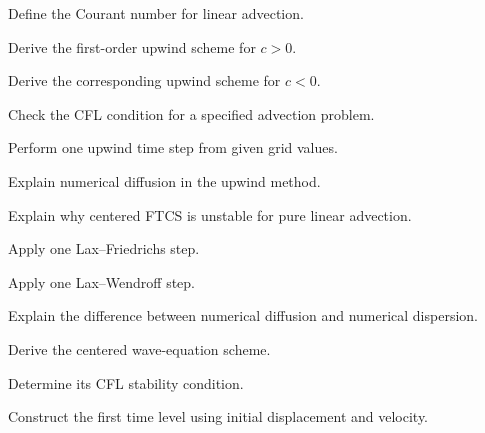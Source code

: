 \begin{exercise}[2]
Define the Courant number for linear advection.
\end{exercise}

\begin{exercise}[3]
Derive the first-order upwind scheme for \(c>0\).
\end{exercise}

\begin{exercise}[3]
Derive the corresponding upwind scheme for \(c<0\).
\end{exercise}

\begin{exercise}[3]
Check the CFL condition for a specified advection problem.
\end{exercise}

\begin{exercise}[3]
Perform one upwind time step from given grid values.
\end{exercise}

\begin{exercise}[3]
Explain numerical diffusion in the upwind method.
\end{exercise}

\begin{exercise}[3]
Explain why centered FTCS is unstable for pure linear advection.
\end{exercise}

\begin{exercise}[3]
Apply one Lax--Friedrichs step.
\end{exercise}

\begin{exercise}[3]
Apply one Lax--Wendroff step.
\end{exercise}

\begin{exercise}[3]
Explain the difference between numerical diffusion and numerical
dispersion.
\end{exercise}

\begin{exercise}[2]
Derive the centered wave-equation scheme.
\end{exercise}

\begin{exercise}[3]
Determine its CFL stability condition.
\end{exercise}

\begin{exercise}[3]
Construct the first time level using initial displacement and velocity.
\end{exercise}


